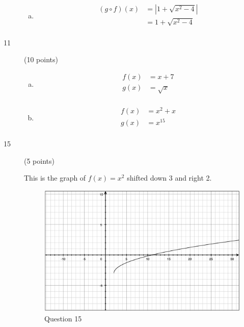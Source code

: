 \documentclass{exam}
\begin{document}
\begin{description}
\begin{enumerate}[(a)]
\item
\begin{align*}
  (g \circ f)(x) &= \left| 1+\sqrt{x^2 - 4} \right| \\
                 &= 1+\sqrt{x^2 - 4} \\
\end{align*}

\end{enumerate}

\item[11] (10 points)
\begin{enumerate}[(a)]

\item
\begin{align*}
  f(x) &= x + 7 \\
  g(x) &= \sqrt{x} \\
\end{align*}

\item
\begin{align*}
  f(x) &= x^2 + x \\
  g(x) &= x^{15} \\
\end{align*}

\end{enumerate}

\pagebreak

\item[15] (5 points)

This is the graph of $f(x) = x^2$ shifted down 3 and right 2.

\begin{figure}[H]
  \centering
  \includegraphics[scale=.3]{question_15.eps}
  \caption*{Question 15}
\end{figure}


\end{description}
\end{document}
